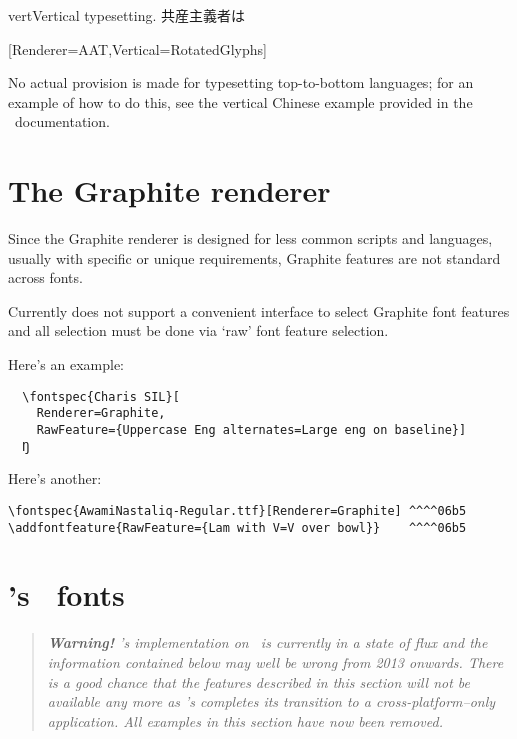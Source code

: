 \documentclass[a4paper]{l3doc}
\begin{document}
\begin{Xexample}[firstline=2]{vert}{Vertical typesetting.}
  \def\verttext{共産主義者は}
  \verttext

  [Renderer=AAT,Vertical=RotatedGlyphs]
  \rotatebox{-90}{\verttext}%
\end{Xexample}

No actual provision is made for typesetting top-to-bottom
languages; for an example of how to do this, see the vertical Chinese
example provided in the \XeTeX\ documentation.


\section{The Graphite renderer}
\label{sec:graphite-features}

Since the Graphite renderer is designed for less common scripts and languages, usually with
specific or unique requirements, Graphite features are not standard across fonts.

Currently  does not support a convenient interface to select Graphite font
features and all selection must be done via `raw' font feature selection.

Here's an example:
\begin{Verbatim}
  \fontspec{Charis SIL}[
    Renderer=Graphite,
    RawFeature={Uppercase Eng alternates=Large eng on baseline}]
  Ŋ
\end{Verbatim}

Here's another:
\begin{Verbatim}
\fontspec{AwamiNastaliq-Regular.ttf}[Renderer=Graphite] ^^^^06b5
\addfontfeature{RawFeature={Lam with V=V over bowl}}    ^^^^06b5
\end{Verbatim}



\section{\MacOSX's \AAT\ fonts}
\label{sec:aat-features}

\begin{quote}\itshape
\textbf{Warning!}
\XeTeX's implementation on \MacOSX\ is currently in a state of flux and the information contained below may well be wrong from 2013 onwards.
There is a good chance that the features described in this section will not be available any more as \XeTeX's completes its transition to a cross-platform--only application.
All examples in this section have now been removed.
\end{quote}
\end{document}
